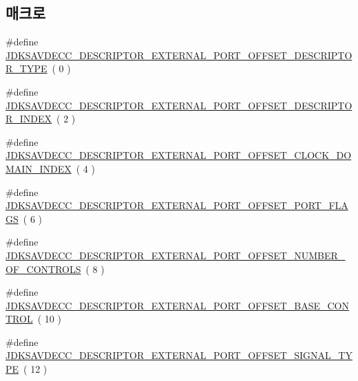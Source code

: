 \subsection*{매크로}
\begin{DoxyCompactItemize}
\item 
\#define \hyperlink{group__descriptor__external__port_ga2e981b175d84cf6616865173770c8452}{J\+D\+K\+S\+A\+V\+D\+E\+C\+C\+\_\+\+D\+E\+S\+C\+R\+I\+P\+T\+O\+R\+\_\+\+E\+X\+T\+E\+R\+N\+A\+L\+\_\+\+P\+O\+R\+T\+\_\+\+O\+F\+F\+S\+E\+T\+\_\+\+D\+E\+S\+C\+R\+I\+P\+T\+O\+R\+\_\+\+T\+Y\+PE}~( 0 )
\item 
\#define \hyperlink{group__descriptor__external__port_gab2161fd260870a01e7d4a95973de3cbd}{J\+D\+K\+S\+A\+V\+D\+E\+C\+C\+\_\+\+D\+E\+S\+C\+R\+I\+P\+T\+O\+R\+\_\+\+E\+X\+T\+E\+R\+N\+A\+L\+\_\+\+P\+O\+R\+T\+\_\+\+O\+F\+F\+S\+E\+T\+\_\+\+D\+E\+S\+C\+R\+I\+P\+T\+O\+R\+\_\+\+I\+N\+D\+EX}~( 2 )
\item 
\#define \hyperlink{group__descriptor__external__port_ga01e5e4f58785a82fb878bd5a8cb42858}{J\+D\+K\+S\+A\+V\+D\+E\+C\+C\+\_\+\+D\+E\+S\+C\+R\+I\+P\+T\+O\+R\+\_\+\+E\+X\+T\+E\+R\+N\+A\+L\+\_\+\+P\+O\+R\+T\+\_\+\+O\+F\+F\+S\+E\+T\+\_\+\+C\+L\+O\+C\+K\+\_\+\+D\+O\+M\+A\+I\+N\+\_\+\+I\+N\+D\+EX}~( 4 )
\item 
\#define \hyperlink{group__descriptor__external__port_gabea561f08df7f79a3ddf1f8747690d04}{J\+D\+K\+S\+A\+V\+D\+E\+C\+C\+\_\+\+D\+E\+S\+C\+R\+I\+P\+T\+O\+R\+\_\+\+E\+X\+T\+E\+R\+N\+A\+L\+\_\+\+P\+O\+R\+T\+\_\+\+O\+F\+F\+S\+E\+T\+\_\+\+P\+O\+R\+T\+\_\+\+F\+L\+A\+GS}~( 6 )
\item 
\#define \hyperlink{group__descriptor__external__port_ga4b6eba5f52878cf0482d40793f63257e}{J\+D\+K\+S\+A\+V\+D\+E\+C\+C\+\_\+\+D\+E\+S\+C\+R\+I\+P\+T\+O\+R\+\_\+\+E\+X\+T\+E\+R\+N\+A\+L\+\_\+\+P\+O\+R\+T\+\_\+\+O\+F\+F\+S\+E\+T\+\_\+\+N\+U\+M\+B\+E\+R\+\_\+\+O\+F\+\_\+\+C\+O\+N\+T\+R\+O\+LS}~( 8 )
\item 
\#define \hyperlink{group__descriptor__external__port_gac463f143c1e46725c5a8da713b556b35}{J\+D\+K\+S\+A\+V\+D\+E\+C\+C\+\_\+\+D\+E\+S\+C\+R\+I\+P\+T\+O\+R\+\_\+\+E\+X\+T\+E\+R\+N\+A\+L\+\_\+\+P\+O\+R\+T\+\_\+\+O\+F\+F\+S\+E\+T\+\_\+\+B\+A\+S\+E\+\_\+\+C\+O\+N\+T\+R\+OL}~( 10 )
\item 
\#define \hyperlink{group__descriptor__external__port_gaf84bf76545664e6cd1a2a0bd7a761d50}{J\+D\+K\+S\+A\+V\+D\+E\+C\+C\+\_\+\+D\+E\+S\+C\+R\+I\+P\+T\+O\+R\+\_\+\+E\+X\+T\+E\+R\+N\+A\+L\+\_\+\+P\+O\+R\+T\+\_\+\+O\+F\+F\+S\+E\+T\+\_\+\+S\+I\+G\+N\+A\+L\+\_\+\+T\+Y\+PE}~( 12 )
\item 

\end{DoxyCompactItemize}

